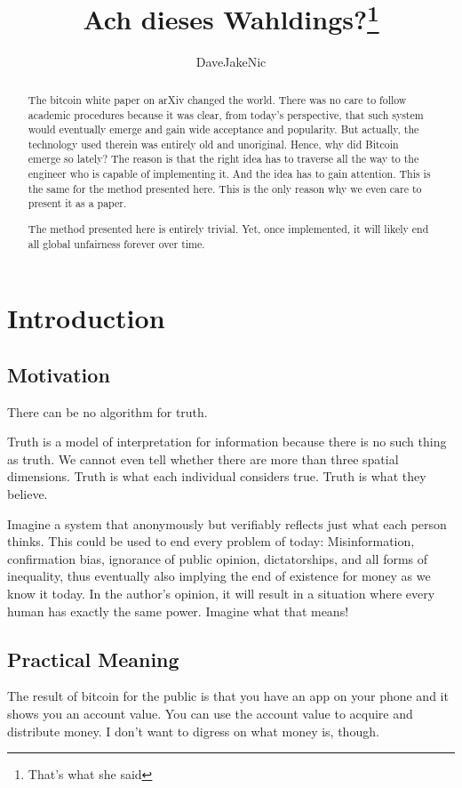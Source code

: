 \documentclass{article}
\title{Ach dieses Wahldings?\footnote{That's what she said}}
\author{DaveJakeNic}
\theoremstyle{definition}
\begin{document}
	
	\maketitle
	
	\begin{abstract}
		The bitcoin white paper on arXiv changed the world. There was no care to follow academic procedures because it was clear, from today's perspective, that such system would eventually emerge and gain wide acceptance and popularity. But actually, the technology used therein was entirely old and unoriginal. Hence, why did Bitcoin emerge so lately? The reason is that the right idea has to traverse all the way to the engineer who is capable of implementing it. And the idea has to gain attention. This is the same for the method presented here. This is the only reason why we even care to present it as a paper.
		
		The method presented here is entirely trivial. Yet, once implemented, it will likely end all global unfairness forever over time.
	\end{abstract}

\tableofcontents
	
	\section{Introduction}
	
	\subsection{Motivation}
	There can be no algorithm for truth.
	
	Truth is a model of interpretation for information because there is no such thing as truth. We cannot even tell whether there are more than three spatial dimensions. Truth is what each individual considers true. Truth is what they believe.
	
	Imagine a system that anonymously but verifiably reflects just what each person thinks. This could be used to end every problem of today: Misinformation, confirmation bias, ignorance of public opinion, dictatorships, and all forms of inequality, thus eventually also implying the end of existence for money as we know it today. In the author's opinion, it will result in a situation where every human has exactly the same power. Imagine what that means!
	
	\subsection{Practical Meaning}
	The result of bitcoin for the public is that you have an app on your phone and it shows you an account value. You can use the account value to acquire and distribute money. I don't want to digress on what money is, though.
	
\end{document}
